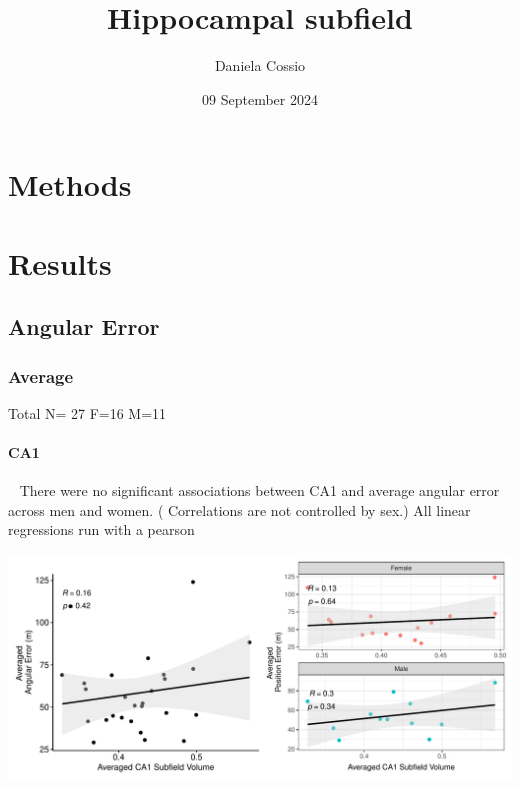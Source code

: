 \documentclass[
]{article}
\title{Hippocampal subfield}
\author{Daniela Cossio}
\date{09 September 2024}
\begin{document}
\maketitle

{
\setcounter{tocdepth}{3}
\tableofcontents
}
\newpage

\section{Methods}

\vspace{1cm}
\vspace{1cm}

\section{Results}
\vspace{1cm}
\subsection{Angular Error}
\vspace{1cm}
\vspace{1cm}

\subsubsection{Average}

Total N= 27 F=16 M=11

\paragraph{CA1}

~ There were no significant associations between CA1 and average angular
error across men and women. ( Correlations are not controlled by sex.)
All linear regressions run with a pearson \vspace{1cm}

\includegraphics{hippocampal_subfield_files/figure-latex/unnamed-chunk-1-1.pdf}
\end{document}
